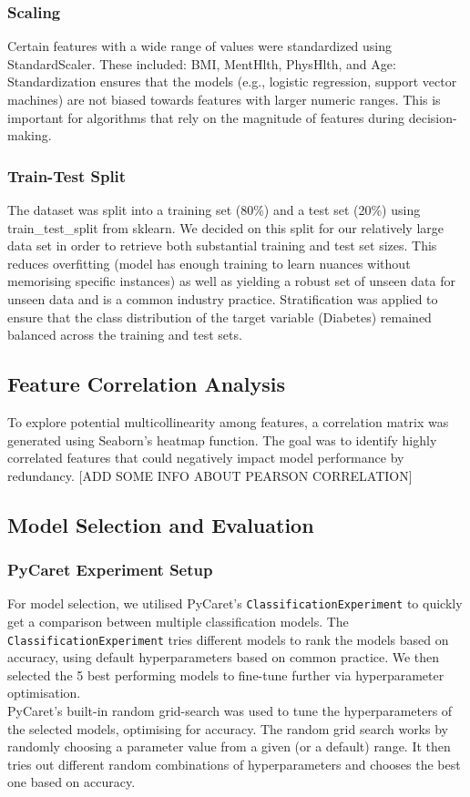 \documentclass[a4paper,12pt]{article}
\begin{document}
\subsubsection{Scaling}
Certain features with a wide range of values were standardized using StandardScaler. These included:
BMI, MentHlth, PhysHlth, and Age: Standardization ensures that the models 
(e.g., logistic regression, support vector machines) are not biased towards features with larger 
numeric ranges. This is important for algorithms that rely on the magnitude of features during 
decision-making.

\subsubsection{Train-Test Split}
The dataset was split into a training set (80\%) and a test set (20\%) using train\_test\_split from 
sklearn. We decided on this split for our relatively large data set in order to retrieve both substantial 
training and test set sizes. This reduces overfitting (model has enough training to learn nuances without 
memorising specific instances) as well as yielding a robust set of unseen data for unseen data and is a common industry practice. 
Stratification was applied to ensure that the class distribution of the target variable 
(Diabetes) remained balanced across the training and test sets.

\subsection{Feature Correlation Analysis}
To explore potential multicollinearity among features, a correlation matrix was generated using 
Seaborn's heatmap function. The goal was to identify highly correlated features that could negatively 
impact model performance by redundancy. [ADD SOME INFO ABOUT PEARSON CORRELATION]

\subsection{Model Selection and Evaluation}
\subsubsection{PyCaret Experiment Setup}
For model selection, we utilised PyCaret's \texttt{ClassificationExperiment} to quickly get a 
comparison between multiple classification models. The \texttt{ClassificationExperiment} tries 
different models to rank the models based on accuracy, using default hyperparameters based on common practice. 
We then selected the 5 best performing models to fine-tune further via hyperparameter optimisation. 
\\
PyCaret’s built-in random grid-search was used to tune the hyperparameters of the selected models, 
optimising for accuracy. The random grid search works by 
randomly choosing a parameter value from a given (or a default) range. It then tries out different random combinations
of hyperparameters and chooses the best one based on accuracy.
\end{document}
